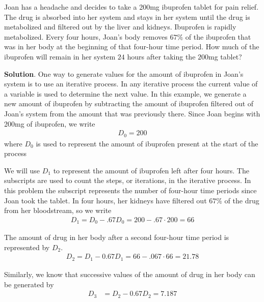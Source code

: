 \documentclass[10pt,]{book}
\theoremstyle{ptxdefinitionnotitle}
\theoremstyle{ptxdefinitiontitle}
\theoremstyle{ptxdefinitionnotitle}
\theoremstyle{ptxdefinitiontitle}
\theoremstyle{ptxdefinitionnotitle}
\theoremstyle{ptxdefinitiontitle}
\numberwithin{equation}{section}
\newcommand{\amp}{&}
\begin{document}
\begin{example}\label{ibuprofen-example-one-dose}
\hypertarget{p-6}{}%
Joan has a headache and decides to take a 200mg ibuprofen tablet for pain relief.  The drug is absorbed into her system and stays in her system until the drug is metabolized and filtered out by the liver and kidneys.  Ibuprofen is rapidly metabolized.  Every four hours, Joan's body removes \(67\%\) of the ibuprofen that was in her body at the beginning of that four-hour time period.  How much of the ibuprofen will remain in her system \(24\) hours after taking the \(200\)mg tablet?%
\par\smallskip%
\noindent\textbf{Solution}.\hypertarget{solution-1}{}\quad%
\hypertarget{p-7}{}%
One way to generate values for the amount of ibuprofen in Joan's system is to use an iterative process.  In any iterative process the current value of a variable is used to determine the next value.  In this example, we generate a new amount of ibuprofen by subtracting the amount of ibuprofen filtered out of Joan's system from the amount that was previously there.  Since Joan begins with 200mg of ibuprofen, we write%
\begin{gather*}
D_0 = 200
\end{gather*}
where \(D_0\) is used to represent the amount of ibuprofen present at the start of the process%
\par
\hypertarget{p-8}{}%
We will use \(D_1\) to represent the amount of ibuprofen left after four hours.  The subscripts are used to count the steps, or iterations,  in the iterative process. In this problem the subscript  represents the number of four-hour time periods since Joan took the tablet.  In four hours, her kidneys have filtered out \(67\%\) of the drug from her bloodstream, so we write%
\begin{gather*}
D_1=D_0-.67D_0=200-.67 \cdot 200 = 66
\end{gather*}
%
\par
\hypertarget{p-9}{}%
The amount of drug in her body after a second four-hour time period is represented by \(D_2\).%
\begin{gather*}
D_2=D_1-0.67D_1=66-.067 \cdot 66 = 21.78
\end{gather*}
%
\par
\hypertarget{p-10}{}%
Similarly, we know that successive values of the amount of drug in her body can be generated by%
\begin{align*}
D_3 \amp = D_2-0.67D_2 = 7.187\\

\end{align*}
\end{example}
\end{document}
